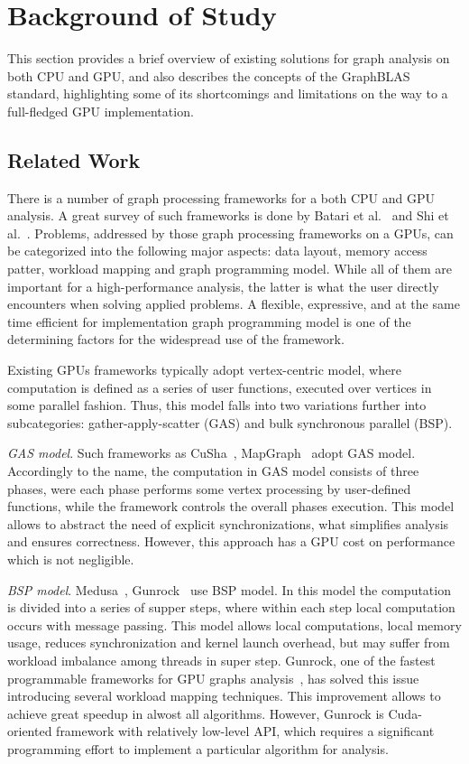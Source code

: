 \section{Background of Study}

This section provides a brief overview of existing solutions for graph analysis on both CPU and GPU, and also describes the concepts of the GraphBLAS standard, highlighting some of its shortcomings and limitations on the way to a full-fledged GPU implementation.

\subsection{Related Work}

There is a number of graph processing frameworks for a both CPU and GPU analysis. A great survey of such frameworks is done by Batari et al.~\cite{article:batarfi_survey_graphs} and Shi et al.~\cite{article:shi_survey_graphs}. Problems, addressed by those graph processing frameworks on a GPUs, can be categorized into the following major aspects: data layout, memory access patter, workload mapping and graph programming model. While all of them are important for a high-performance analysis, the latter is what the user directly encounters when solving applied problems. A flexible, expressive, and at the same time efficient for implementation graph programming model is one of the determining factors for the widespread use of the framework.

Existing GPUs frameworks typically adopt vertex-centric model, where computation is defined as a series of user functions, executed over vertices in some parallel fashion. Thus, this model falls into two variations further into subcategories: gather-apply-scatter (GAS) and bulk synchronous parallel (BSP). 

\textit{GAS model}. Such frameworks as CuSha~\cite{10.1145/2600212.2600227}, MapGraph~\cite{10.1145/2621934.2621936/MapGraph} adopt GAS model. 
Accordingly to the name, the computation in GAS model consists of three phases, were each phase performs some vertex processing by user-defined functions, while the framework controls the overall phases execution. This model allows to abstract the need of explicit synchronizations, what simplifies analysis and ensures correctness. However, this approach has a GPU cost on performance which is not negligible.

\textit{BSP model}. Medusa~\cite{6497047/Medusa}, Gunrock~\cite{7967137} use BSP model. In this model the computation is divided into a series of supper steps, where within each step local computation occurs with message passing. This model allows local computations, local memory usage, reduces synchronization and kernel launch overhead, but may suffer from workload imbalance among threads in super step. Gunrock, one of the fastest programmable frameworks for GPU graphs analysis~\cite{article:shi_survey_graphs},  has solved this issue introducing several workload mapping techniques. This improvement allows to achieve great speedup in alwost all algorithms. However, Gunrock is Cuda-oriented framework with relatively low-level API, which requires a significant programming effort to implement a particular algorithm for analysis.

